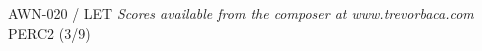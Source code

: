 \documentclass[11pt]{report}
\begin{document}
\null \vfill

AWN-020 / LET \hfill
\textit{Scores available from the composer at www.trevorbaca.com}
\hfill PERC2 (3/9)
\end{document}
